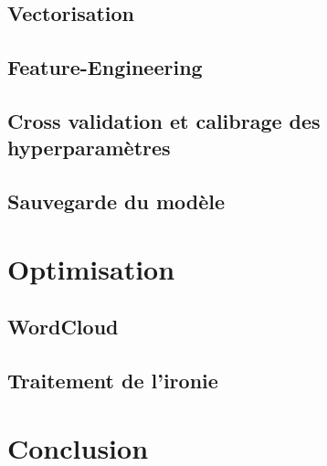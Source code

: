 \documentclass[12pt,a4paper]{report}
\theoremstyle{definition}
\begin{document}
\section{Vectorisation}
\section{Feature-Engineering}
\section{Cross validation et calibrage des hyperparamètres}
\section{Sauvegarde du modèle}

\chapter{Optimisation}
\section{WordCloud}
\section{Traitement de l'ironie}

\chapter{Conclusion}
\end{document}
